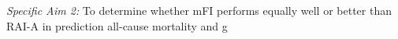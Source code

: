 \emph{Specific Aim 2:} To determine whether mFI performs equally well or better than RAI-A in prediction all-cause mortality and g